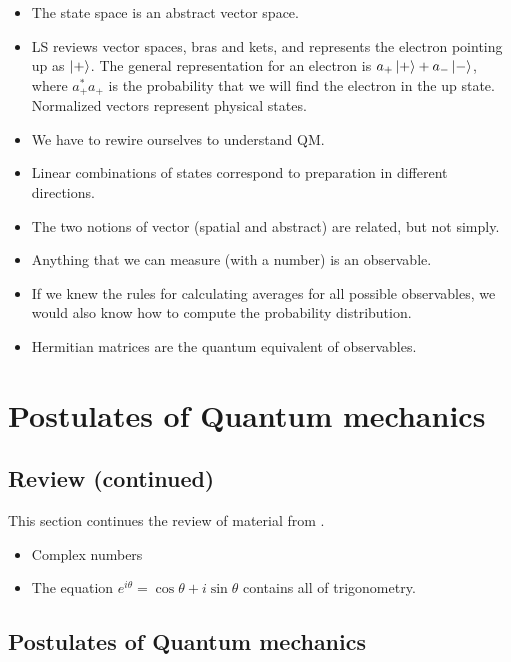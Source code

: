 \documentclass[]{article}
\begin{document}
\begin{itemize}
	\item The state space is an abstract vector space.

	\item LS reviews vector spaces, bras and kets, and represents the electron pointing up as $\ket{+}$. The general representation for an electron is $a_+\ket{+}+a_-\ket{-}$, where $a_+^*a_+$ is the probability that we will find the electron in the up state. Normalized vectors represent physical states.
	
	\item We have to rewire ourselves to understand QM.

	\item Linear combinations of states correspond to preparation in different directions.
	
	\item The two notions of vector (spatial and abstract) are related, but not simply.
	
	\item Anything that we can measure (with a number) is an observable.
	
	\item If we knew the rules for calculating averages for all possible observables, we would also know how to compute the probability distribution.
	
	\item Hermitian matrices are the quantum equivalent of observables.
	
\end{itemize}


\section{Postulates of Quantum mechanics}
\subsection{Review (continued)}
This section continues the review of material from \cite{susskind2013quantum}.

\begin{itemize}
	\item Complex numbers
	\item The equation $e^{i\theta} = \cos{\theta} + i \sin{\theta}$ contains all of trigonometry.
\end{itemize}

\subsection{Postulates of Quantum mechanics}
\end{document}
